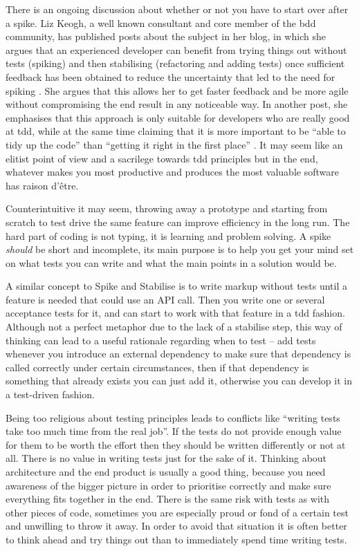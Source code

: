 \documentclass[11pt]{article}
\begin{document}
There is an ongoing discussion about whether or not you have to start over after a spike. Liz Keogh, a well known consultant and core member of the \gls{bdd} community, has published posts about the subject in her blog, in which she argues that an experienced developer can benefit from trying things out without tests (spiking) and then stabilising (refactoring and adding tests) once sufficient feedback has been obtained to reduce the uncertainty that led to the need for spiking \cite{Liz1}. She argues that this allows her to get faster feedback and be more agile without compromising the end result in any noticeable way. In another post, she emphasises that this approach is only suitable for developers who are really good at \gls{tdd}, while at the same time claiming that it is more important to be ``able to tidy up the code'' than ``getting it right in the first place'' \cite{Liz2}. It may seem like an elitist point of view and a sacrilege towards \gls{tdd} principles but in the end, whatever makes you most productive and produces the most valuable software has raison d'être.

Counterintuitive it may seem, throwing away a prototype and starting from scratch to test drive the same feature can improve efficiency in the long run. The hard part of coding is not typing, it is learning and problem solving. A spike \emph{should} be short and incomplete, its main purpose is to help you get your mind set on what tests you can write and what the main points in a solution would be. \cite[question~60]{Edelstam}

A similar concept to Spike and Stabilise is to write markup without tests until a feature is needed that could use an API call. Then you write one or several acceptance tests for it, and can start to work with that feature in a \gls{tdd} fashion. \cite[question~30]{Ahnve} Although not a perfect metaphor due to the lack of a stabilise step, this way of thinking can lead to a useful rationale regarding when to test -- add tests whenever you introduce an external dependency to make sure that dependency is called correctly under certain circumstances, then if that dependency is something that already exists you can just add it, otherwise you can develop it in a test-driven fashion.

Being too religious about testing principles leads to conflicts like ``writing tests take too much time from the real job''. If the tests do not provide enough value for them to be worth the effort then they should be written differently or not at all. There is no value in writing tests just for the sake of it. Thinking about architecture and the end product is usually a good thing, because you need awareness of the bigger picture in order to prioritise correctly and make sure everything fits together in the end. There is the same risk with tests as with other pieces of code, sometimes you are especially proud or fond of a certain test and unwilling to throw it away. In order to avoid that situation it is often better to think ahead and try things out than to immediately spend time writing tests. \cite[question~27]{Edelstam}
\end{document}
